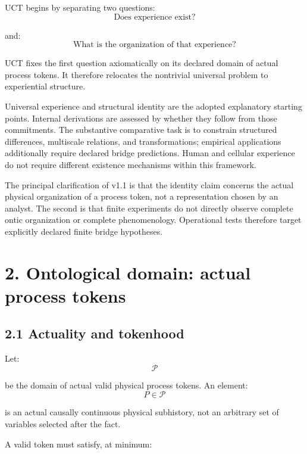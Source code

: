\documentclass[
  11pt,
  a4paper,
]{article}
\begin{document}
UCT begins by separating two questions:
\nopagebreak[4]
\[
\boxed{\text{Does experience exist?}}
\]

and:
\nopagebreak[4]
\[
\boxed{\text{What is the organization of that experience?}}
\]

UCT fixes the first question axiomatically on its declared domain of
actual process tokens. It therefore relocates the nontrivial universal
problem to experiential structure.

Universal experience and structural identity are the adopted explanatory
starting points. Internal derivations are assessed by whether they
follow from those commitments. The substantive comparative task is to
constrain structured differences, multiscale relations, and
transformations; empirical applications additionally require declared
bridge predictions. Human and cellular experience do not require
different existence mechanisms within this framework.

The principal clarification of v1.1 is that the identity claim concerns
the actual physical organization of a process token, not a
representation chosen by an analyst. The second is that finite
experiments do not directly observe complete ontic organization or
complete phenomenology. Operational tests therefore target explicitly
declared finite bridge hypotheses.

\hypertarget{ontological-domain-actual-process-tokens}{%
\section{2. Ontological domain: actual process
tokens}\label{ontological-domain-actual-process-tokens}}

\hypertarget{actuality-and-tokenhood}{%
\subsection{2.1 Actuality and tokenhood}\label{actuality-and-tokenhood}}

Let:
\nopagebreak[4]
\[
\mathcal P
\]

be the domain of actual valid physical process tokens. An element:
\nopagebreak[4]
\[
P\in\mathcal P
\]

is an actual causally continuous physical subhistory, not an arbitrary
set of variables selected after the fact.

A valid token must satisfy, at minimum:
\end{document}
